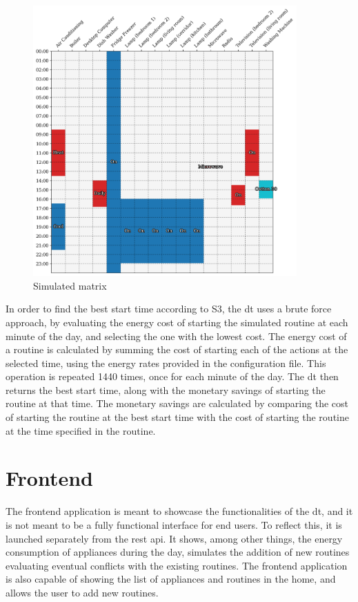 \begin{figure}
    \centering
    \includegraphics[width=0.9\textwidth]{images/simulated_matrix.png}
    \caption{Simulated matrix}
    \label{fig:simulated_consumption_matrix}
\end{figure}

In order to find the best start time according to S3, the \acrshort{dt} uses a brute force approach, by evaluating the energy cost of starting the simulated routine at each minute of the day, and selecting the one with the lowest cost. The energy cost of a routine is calculated by summing the cost of starting each of the actions at the selected time, using the energy rates provided in the configuration file. This operation is repeated 1440 times, once for each minute of the day. The \acrshort{dt} then returns the best start time, along with the monetary savings of starting the routine at that time. The monetary savings are calculated by comparing the cost of starting the routine at the best start time with the cost of starting the routine at the time specified in the routine. 

\section{Frontend}

The frontend application is meant to showcase the functionalities of the \acrshort{dt}, and it is not meant to be a fully functional interface for end users. To reflect this, it is launched separately from the \acrshort{rest} \acrshort{api}. It shows, among other things, the energy consumption of appliances during the day, simulates the addition of new routines evaluating eventual conflicts with the existing routines. The frontend application is also capable of showing the list of appliances and routines in the home, and allows the user to add new routines.

